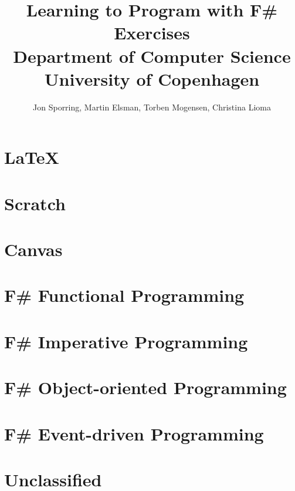 \documentclass[a4paper,12pt]{report}
\title{Learning to Program with F\#\\Exercises\\Department of Computer
  Science\\University of Copenhagen}
\author{Jon Sporring, Martin Elsman, Torben Mogensen, Christina Lioma}
\begin{document}
\maketitle
\tableofcontents
\newpage
\chapter{\LaTeX}


\chapter{Scratch}



\chapter{Canvas}


\chapter{F\# Functional Programming}













\chapter{F\# Imperative Programming}







\chapter{F\# Object-oriented Programming}










\chapter{F\# Event-driven Programming}





\chapter{Unclassified}
















\end{document}
